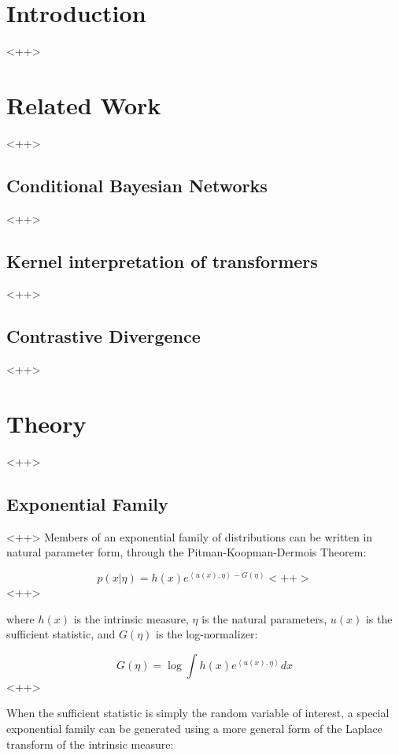 \documentclass[a4paper]{article}
\begin{document}
\section{Introduction}<++>

\section{Related Work}<++>

\subsection{Conditional Bayesian Networks}<++>

\subsection{Kernel interpretation of transformers}<++>

\subsection{Contrastive Divergence}<++>

\section{Theory}<++>

\subsection{Exponential Family}<++>
Members of an exponential family of distributions can be written in natural parameter form, through the Pitman-Koopman-Dermois Theorem:

\begin{equation}
  p(x \vert \eta) = h(x)e^{\left< u(x),\eta\right> - G(\eta) }<++>
  \label{<++>}
\end{equation}<++>

where $h(x)$ is the intrinsic measure, $\eta$ is the natural parameters, $u(x)$ is the sufficient statistic, and $G(\eta)$ is the log-normalizer:

\begin{equation}
  G(\eta) = \log \int h(x) e^{ \left< u(x), \eta \right> } dx
  \label{<++>}
\end{equation}<++>

When the sufficient statistic is simply the random variable of interest, a special exponential family can be generated using a more general form of the Laplace transform of the intrinsic measure:
\end{document}
